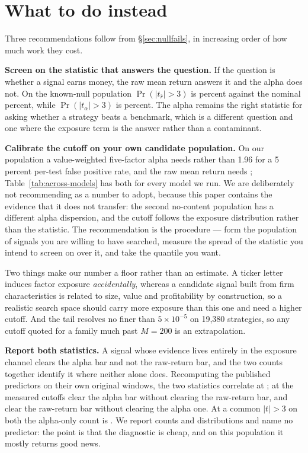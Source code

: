 \documentclass{article}
\begin{document}
\section{What to do instead}
\label{sec:remedy}

Three recommendations follow from \S\ref{sec:nullfails}, in increasing order of
how much work they cost.

\textbf{Screen on the statistic that answers the question.} If the question is
whether a signal earns money, the raw mean return answers it and the alpha does
not. On the known-null population $\Pr(|t_{\bar r}| > 3)$ is
\bzooamThreeRawVwPct{} percent against the nominal \bzoonominalThreePct{}
percent, while $\Pr(|t_\alpha| > 3)$ is \bzooamThreeFfFiveVwPct{} percent. The
alpha remains the right statistic for asking whether a strategy beats a
benchmark, which is a different question and one where the exposure term is the
answer rather than a contaminant.

\textbf{Calibrate the cutoff on your own candidate population.} On our
population a value-weighted five-factor alpha needs \bzooamCutoffFfFiveVw{}
rather than 1.96 for a 5 percent per-test false positive rate, and the raw mean
return needs \bzooamCutoffRawVw{}; Table~\ref{tab:across-models} has both for
every model we run. We are deliberately not recommending
\bzooamCutoffFfFiveVw{} as a number to adopt, because this paper contains the
evidence that it does not transfer: the second no-content population has a
different alpha dispersion, and the cutoff follows the exposure distribution
rather than the statistic. The recommendation is the procedure --- form the
population of signals you are willing to have searched, measure the spread of
the statistic you intend to screen on over it, and take the quantile you want.

Two things make our number a floor rather than an estimate. A ticker letter
induces factor exposure \emph{accidentally}, whereas a candidate signal built
from firm characteristics is related to size, value and profitability by
construction, so a realistic search space should carry more exposure than this
one and need a higher cutoff. And the tail resolves no finer than
$5 \times 10^{-5}$ on 19{,}380 strategies, so any cutoff quoted for a family
much past $M = 200$ is an extrapolation.

\textbf{Report both statistics.} A signal whose evidence lives entirely in the
exposure channel clears the alpha bar and not the raw-return bar, and the two
counts together identify it where neither alone does. Recomputing the
\bzooamPubN{} published predictors on their own original windows, the two
statistics correlate at \bzooamPubCorr{}; at the measured cutoffs
\bzooamPubAlphaOnly{} clear the alpha bar without clearing the raw-return bar,
and \bzooamPubMeanOnly{} clear the raw-return bar without clearing the alpha
one. At a common $|t| > 3$ on both the alpha-only count is
\bzooamPubAlphaOnlyThree{}. We report counts and distributions and name no
predictor: the point is that the diagnostic is cheap, and on this population it
mostly returns good news.
\end{document}
